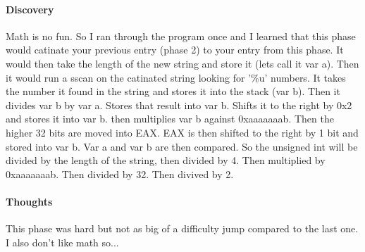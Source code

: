 \documentclass[12pt]{article}
\begin{document}
\paragraph{Discovery}
Math is no fun. So I ran through the program once and I learned that this phase would catinate your previous entry (phase 2) to your entry from this phase. It would then take the length of the new string and store it (lets call it var a). Then it would run a sscan on the catinated string looking for '\%u' numbers. It takes the number it found in the string and stores it into the stack (var b). Then it divides var b by var a. Stores that result into var b. Shifts it to the right by 0x2 and stores it into var b. then multiplies var b against 0xaaaaaaab. Then the higher 32 bits are moved into EAX. EAX is then shifted to the right by 1 bit and stored into var b. 
Var a and var b are then compared. 
So the unsigned int will be divided by the length of the string, then divided by 4. Then multiplied by 0xaaaaaaab. Then divided by 32. Then divived by 2.

\paragraph{Thoughts}
This phase was hard but not as big of a difficulty jump compared to the last one. I also don't like math so...
\end{document}
